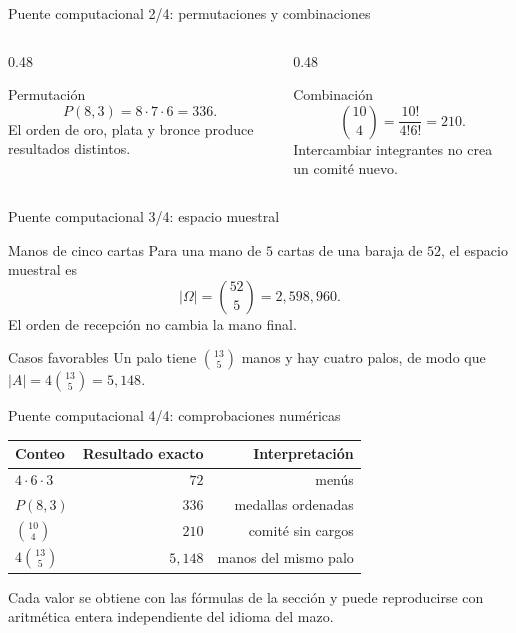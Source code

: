 \documentclass[10pt,aspectratio=169]{beamer}
\begin{document}
\begin{frame}{Puente computacional 2/4: permutaciones y combinaciones}
  \footnotesize
  \begin{columns}[T]
    \begin{column}{0.48\textwidth}
      \begin{block}{Permutación}
        \[
          P(8,3)=8\cdot7\cdot6=336.
        \]
        El orden de oro, plata y bronce produce resultados distintos.
      \end{block}
    \end{column}
    \begin{column}{0.48\textwidth}
      \begin{block}{Combinación}
        \[
          \binom{10}{4}=\frac{10!}{4!6!}=210.
        \]
        Intercambiar integrantes no crea un comité nuevo.
      \end{block}
    \end{column}
  \end{columns}
\end{frame}

\begin{frame}{Puente computacional 3/4: espacio muestral}
  \small
  \begin{block}{Manos de cinco cartas}
    Para una mano de $5$ cartas de una baraja de $52$, el espacio muestral es
    \[
      \lvert\Omega\rvert=\binom{52}{5}=2{,}598{,}960.
    \]
    El orden de recepción no cambia la mano final.
  \end{block}
  \pause
  \begin{alertblock}{Casos favorables}
    Un palo tiene $\binom{13}{5}$ manos y hay cuatro palos, de modo que
    $\lvert A\rvert=4\binom{13}{5}=5{,}148$.
  \end{alertblock}
\end{frame}

\begin{frame}{Puente computacional 4/4: comprobaciones numéricas}
  \scriptsize
  \begin{center}
    \begin{tabular}{lrr}
      \hline
      Conteo & Resultado exacto & Interpretación \\
      \hline
      $4\cdot6\cdot3$ & $72$ & menús \\
      $P(8,3)$ & $336$ & medallas ordenadas \\
      $\binom{10}{4}$ & $210$ & comité sin cargos \\
      $4\binom{13}{5}$ & $5{,}148$ & manos del mismo palo \\
      \hline
    \end{tabular}
  \end{center}
  \vspace{0.1cm}
  Cada valor se obtiene con las fórmulas de la sección y puede reproducirse
  con aritmética entera independiente del idioma del mazo.
\end{frame}
\end{document}
